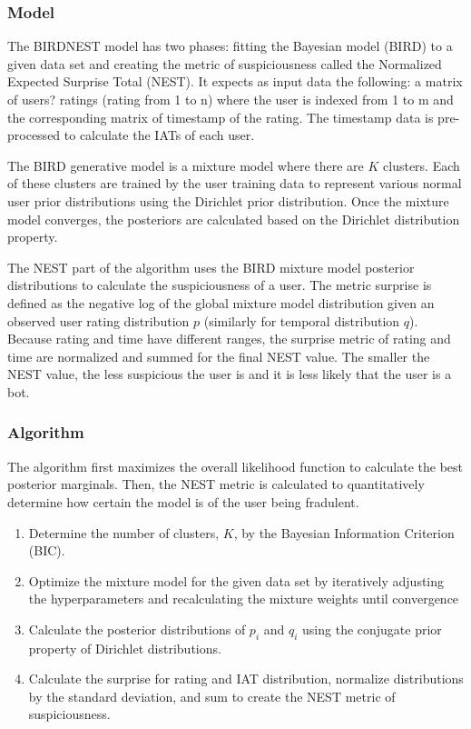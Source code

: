 \documentclass[11pt, oneside]{article}   	%
\begin{document}
\subsubsection*{Model}

\quad The BIRDNEST model has two phases: fitting the Bayesian model (BIRD) to a given data set and creating the metric of suspiciousness called the Normalized Expected Surprise Total (NEST).
It expects as input data the following: a matrix of users? ratings (rating from 1 to n) where the user is indexed from 1 to m and the corresponding matrix of timestamp of the rating.
The timestamp data is pre-processed to calculate the IATs of each user.

\quad The BIRD generative model is a mixture model where there are $K$ clusters.
Each of these clusters are trained by the user training data to represent various normal user prior distributions using the Dirichlet prior distribution.
Once the mixture model converges, the posteriors are calculated based on the Dirichlet distribution property.

\quad The NEST part of the algorithm uses the BIRD mixture model posterior distributions to calculate the suspiciousness of a user.
The metric surprise is defined as the negative log of the global mixture model distribution given an observed user rating distribution $p$ (similarly for temporal distribution $q$).
Because rating and time have different ranges, the surprise metric of rating and time are normalized and summed for the final NEST value.
The smaller the NEST value, the less suspicious the user is and it is less likely that the user is a bot.

\subsubsection*{Algorithm}

\quad The algorithm first maximizes the overall likelihood function to calculate the best posterior marginals.
Then, the NEST metric is calculated to quantitatively determine how certain the model is of the user being fradulent.
\begin{enumerate}
	\item Determine the number of clusters, $K$, by the Bayesian Information Criterion (BIC).
	\item Optimize the mixture model for the given data set by iteratively adjusting the hyperparameters and recalculating the mixture weights until convergence
	\item Calculate the posterior distributions of $p_i$ and $q_i$ using the conjugate prior property of Dirichlet distributions.
	\item Calculate the surprise for rating and IAT distribution, normalize distributions by the standard deviation, and sum to create the NEST metric of suspiciousness. 
\end{enumerate}
\end{document}
